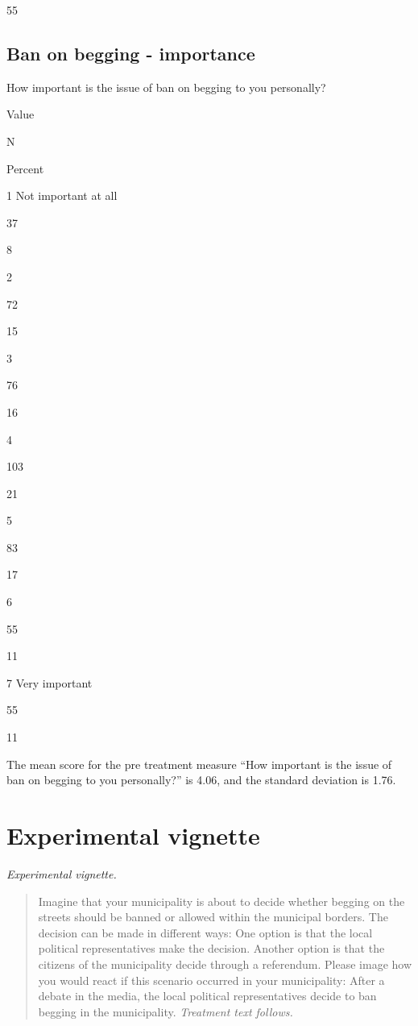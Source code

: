 \documentclass[
]{book}
\begin{document}
55

\hypertarget{ban-on-begging---importance}{%
\subsection{Ban on begging -
importance}\label{ban-on-begging---importance}}

How important is the issue of ban on begging to you personally?

Value

N

Percent

1 Not important at all

37

8

2

72

15

3

76

16

4

103

21

5

83

17

6

55

11

7 Very important

55

11

The mean score for the pre treatment measure ``How important is the
issue of ban on begging to you personally?'' is 4.06, and the standard
deviation is 1.76.

\hypertarget{experimental-vignette}{%
\section{Experimental vignette}\label{experimental-vignette}}

\emph{Experimental vignette.}

\begin{quote}
Imagine that your municipality is about to decide whether begging on the
streets should be banned or allowed within the municipal borders. The
decision can be made in different ways: One option is that the local
political representatives make the decision. Another option is that the
citizens of the municipality decide through a referendum. Please image
how you would react if this scenario occurred in your municipality:
After a debate in the media, the local political representatives decide
to ban begging in the municipality. \emph{Treatment text follows.}
\end{quote}
\end{document}
